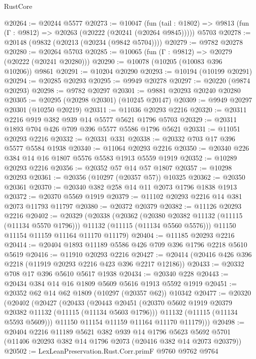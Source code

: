 \begin{lexlean}{RustCore}
\begin{coremodule}
@20264 := @20244 @5577
@20273 := @10047
    (fun (tail : @1802) => @9813 (fun (Γ : @9812) => @20263 (@20222 (@20241 (@20264 @9845)))))
    @5703
@20278 := @20148 (@9832 (@20213 (@20234 (@9842 @5704))))
@20279 := @9782 @20278
@20280 := @20264 @5703
@20285 := @10065 (fun (Γ : @9812) => @20279 (@20222 (@20241 @20280)))
@20290 := @10078 (@10205 (@10083 @396 @10206)) @9861
@20291 := @10204 @20290
@20293 := @10194 (@10199 @20291)
@20294 := @20285 @20293
@20295 := @9949 @20278
@20297 := @20220 (@9874 @20293)
@20298 := @9782 @20297
@20301 := @9881 @20293 @20240 @20280
@20305 := @20295 (@20298 @20301) (@10245 @20147)
@20309 := @9949 @20297 @20301 (@10250 @20219)
@20311 := @11036 @20293 @2216
@20320 := @20311 @2216 @919 @382 @939 @14 @5577 @5621 @1796 @5703
@20329 := @20311 @1893 @704 @426 @709 @396 @5577 @5586 @1796 @5621
@20331 := @11051 @20293 @2216
@20332 := @20331 @331
@20338 := @20332 @703 @17 @396 @5577 @5584 @1938
@20340 := @11064 @20293 @2216
@20350 := @20340 @226 @384 @14 @16 @1807 @5576 @5583 @1913 @5559 @1919
@20352 := @10289 @20293 @2216
@20356 := @20352 @57 @14 @57 @1807
@20357 := @10298 @20293
@20361 := @20356 (@10297 (@20357 @57)) @10325
@20362 := @20350 @20361
@20370 := @20340 @382 @258 @14 @11 @2073 @1796 @1838 @1913
@20372 := @20370 @5569 @1919
@20379 := @11102 @20293 @2216 @14 @381 @2073 @11793 @11797
@20380 := @20372 @20379
@20382 := @11126 @20293 @2216
@20402 := @20329
    (@20338
      (@20362
        (@20380 @20382 @11132 (@11115 (@11134 @5570 @1796)))
        @11132
        (@11115 (@11134 @5560 @5576)))
      @11150
      @11154
      @11159
      @11164
      @11170
      @11179)
@20404 := @11185 @20293 @2216
@20414 := @20404 @1893 @11189 @5586 @426 @709 @396 @1796 @2218 @5610 @5619
@20416 := @11910 @20293 @2216
@20427 := @20414 (@20416 @426 @396 @2218 (@11919 @20293 @2216 @423 @396 @2217 @12186))
@20433 := @20332 @708 @17 @396 @5610 @5617 @1938
@20434 := @20340 @228
@20443 := @20434 @384 @14 @16 @1809 @5609 @5616 @1913 @5592 @1919
@20451 := @20352 @62 @14 @62 @1809 (@10297 (@20357 @62)) @10342
@20477 := @20320
    (@20402
      (@20427
        (@20433
          (@20443
            @20451
            (@20370 @5602 @1919 @20379 @20382 @11132 (@11115 (@11134 @5603 @1796)))
            @11132
            (@11115 (@11134 @5593 @5609)))
          @11150
          @11154
          @11159
          @11164
          @11170
          @11179)))
@20498 := @20404
    @2216
    @11189
    @5621
    @382
    @939
    @14
    @1796
    @5623
    @5692
    @5701
    (@11406 @20293 @382 @14 @1796 @2073 (@20416 @382 @14 @2073 @20379))
@20502 := LexLeanPreservation.Rust.Corr.primF @9760 @9762 @9764

\end{coremodule}
\end{lexlean}
